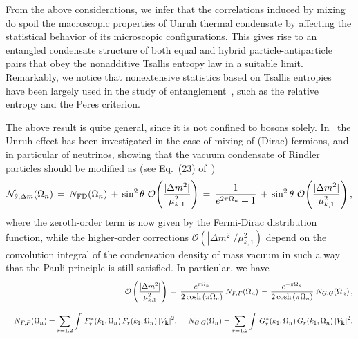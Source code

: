 \documentclass[floats,prd,aps,amssymb,nofootinbib,showkeys]{revtex4}
\newcommand{\be}{\begin{equation}}\newcommand{\ee}{\end{equation}}
\begin{document}
From the above considerations, we infer that 
the correlations induced by mixing do spoil
the macroscopic properties of Unruh 
thermal condensate by affecting the 
statistical behavior of its microscopic configurations. 
This gives rise to an entangled condensate structure 
of both equal and 
hybrid particle-antiparticle pairs that obey the nonadditive 
Tsallis entropy law in a suitable limit. 
Remarkably, we notice that nonextensive
statistics based on Tsallis entropies have been largely used 
in the study of entanglement~\cite{TSENT},
such as the relative entropy and the 
Peres criterion.

The above result is
quite general, since it is not confined to bosons solely.
In~\cite{NonTN} the Unruh effect has been investigated 
in the case of mixing of (Dirac) fermions, and in particular
of neutrinos, showing that
the vacuum condensate of Rindler particles should be
modified as (see Eq.~(23) of~\cite{NonTN})
\be
\label{modFD}
\mathcal{N}_{\theta,\Delta m}(\Omega_n)\,=\,N_{\mathrm{FD}}(\Omega_n)\,+\,\sin^2\theta\,\,\mathcal{O}\hspace{-0.6mm}\left(\frac{|\Delta m^2|}{\mu^2_{k,1}}\right)\,=\,\frac{1}{e^{2\pi\Omega_n}+1}\,+\,\sin^2\theta\,\,\mathcal{O}\hspace{-0.6mm}\left(\frac{|\Delta m^2|}{\mu^2_{k,1}}\right), 
\ee
where the zeroth-order term is now given by the Fermi-Dirac
distribution function, while the higher-order corrections $\mathcal{O}\left({|\Delta m^2|}/{\mu^2_{k,1}}\right)$
depend on the convolution integral of the condensation density
of mass vacuum in such a way that the Pauli principle is still satisfied. In particular, we have~\cite{NonTN}
\begin{eqnarray}
&&\hspace{2.65cm}\mathcal{O}\left(\frac{|\Delta m^2|}{\mu^2_{k,1}}\right)\,=\,\frac{e^{\pi\Omega_n}}{2\hspace{0.1mm}\cosh\left(\pi\Omega_n\right)}\hspace{0.9mm}N_{F,F}(\Omega_n)\,-\,\frac{e^{-\pi\Omega_n}}{2\hspace{0.1mm}\cosh\left(\pi\Omega_n\right)}\hspace{0.9mm}N_{G,G}(\Omega_n)\,,\\[3mm]
&&N_{F,F}(\Omega_n)=\sum_{r=1,2}\int\,F^{\hspace{0.2mm}*}_{r}(k_1,\Omega_n)\,F_{r}(k_1,\Omega_n)\,{|V_{\bf {k}}|}^2,\quad\,\, N_{G,G}(\Omega_n)=\sum_{r=1,2}\int\,G^{\hspace{0.2mm}*}_{r}(k_1,\Omega_n)\,G_{r}(k_1,\Omega_n)\,{|V_{\bf {k}}|}^2.
\end{eqnarray}
\end{document}
